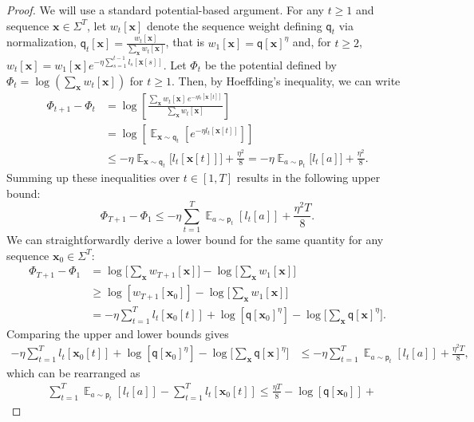 \documentclass{article}
\DeclareMathOperator*{\E}{\mathbb E}
\newcommand{\bx}{{\mathbf x}}
\newcommand{\sfp}{{\mathsf p}}
\newcommand{\sfq}{{\mathsf q}}
\begin{document}
\begin{proof}
  We will use a standard potential-based argument. For any $t \geq 1$
  and sequence $\bx \in \Sigma^T$, let $w_t[\bx]$ denote the sequence
  weight defining $\sfq_t$ via normalization,
  $\sfq_t[\bx] = \frac{w_t[\bx]}{\sum_{\bx} w_t[\bx]}$, that is
  $w_1[\bx] = \sfq[\bx]^\eta$ and, for $t \geq 2$,
  $w_t[\bx] = w_1[\bx] e^{-\eta \sum_{s = 1}^{t - 1}
    l_s[\bx[s]]}$. Let $\Phi_t$ be the potential defined by
  $\Phi_t = \log \left(\sum_{\bx} w_t[\bx] \right)$ for $t \geq
  1$. Then, by Hoeffding's inequality, we can write
  \begin{align*}
    \Phi_{t + 1} - \Phi_t
    & = \log \left [\frac{\sum_{\bx} w_t[\bx] \, e^{-\eta l_t[\bx[t]]}}{\sum_{\bx} w_t[\bx]} \right]\\
    & = \log \left[ \E_{\bx \sim \sfq_t} \left[ e^{-\eta l_t[\bx[t]]} \right] \right] \\
    & \leq -\eta \E_{\bx \sim \sfq_t} \big[ l_t[\bx[t]] \big] + \frac{\eta^2}{8} 
    = -\eta \E_{a \sim \sfp_t} \big[ l_t[a] \big] + \frac{\eta^2}{8}.
  \end{align*}
  Summing up these inequalities over $t \in [1, T]$ results in the
  following upper bound:
\begin{equation*}
  \Phi_{T + 1} - \Phi_1 \leq -\eta \sum_{t = 1}^T \E_{a \sim \sfp_t} \left[
    l_t[a] \right] + \frac{\eta^2 T}{8}.
\end{equation*}
We can straightforwardly derive a lower bound for the same quantity
for any sequence $\bx_0 \in \Sigma^T$:
\begin{align*}
  \Phi_{T + 1} - \Phi_1
  & = \log \Big[ \sum_{\bx} w_{T + 1}[\bx] \Big] - \log \Big[ \sum_{\bx}
    w_1[\bx] \Big] \\
  & \geq \log [ w_{T + 1}[\bx_0] ] - \log \Big[ \sum_{\bx} w_1[\bx] \Big]\\
  & = - \eta \sum_{t = 1}^T l_t[\bx_0[t]] + \log[\sfq[\bx_0]^\eta ] - \log \Big[ \sum_{\bx} \sfq[\bx]^\eta \Big]. 
\end{align*}
Comparing the upper and lower bounds gives
\begin{align*}
  - \eta \sum_{t = 1}^T l_t[\bx_0[t]] + \log[\sfq[\bx_0]^\eta ] - \log \Big[ \sum_{\bx} \sfq[\bx]^\eta \Big]
  & \leq -\eta \sum_{t = 1}^T \E_{a \sim \sfp_t} \left[l_t[a] \right] + \frac{\eta^2 T}{8},
\end{align*}
which can be rearranged as
\begin{align*}
  & \sum_{t = 1}^T \E_{a \sim \sfp_t} \left[l_t[a] \right] - \sum_{t = 1}^T l_t[\bx_0[t]] 
  \leq \frac{\eta T}{8} - \log[\sfq[\bx_0] ] +

\end{align*}
\end{proof}
\end{document}
